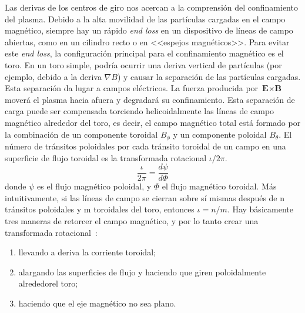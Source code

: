 \par
Las derivas de los centros de giro nos acercan a la comprensión del confinamiento del plasma. 
Debido a la alta movilidad de las partículas cargadas en el campo magnético, siempre hay un 
rápido \textit{end loss} en un dispositivo de líneas de campo abiertas, como en un cilindro recto o en 
<<espejos magnéticos>>. Para evitar este \textit{end loss}, la configuración principal para el 
confinamiento magnético es el toro. En un toro simple, podría ocurrir una deriva vertical de 
partículas (por ejemplo, debido a la deriva $\nabla B$) y causar la separación de las partículas 
cargadas. Esta separación da lugar a campos eléctricos. 
La fuerza producida por $\textbf{E}\times\textbf{B}$ moverá el plasma hacia afuera y degradará su confinamiento. 
Esta separación de carga puede ser compensada torciendo helicoidalmente las líneas 
de campo magnético alrededor del toro, es decir, el campo magnético total está formado por 
la combinación de un componente toroidal $B_\phi$ y un componente poloidal $B_\theta$. El número de 
tránsitos poloidales por cada tránsito toroidal de un campo en una superficie de flujo toroidal 
es la transformada rotacional $\iota/2\pi$.
\begin{equation}\label{eq:transrot}
    \frac{\iota}{2\pi}=\frac{d\psi}{d\Phi}
\end{equation}
donde $\psi$ es el flujo magnético poloidal, y $\Phi$ el flujo magnético toroidal. Más intuitivamente, si
las líneas de campo se cierran sobre sí mismas después de n tránsitos poloidales y m 
toroidales del toro, entonces $\iota=n/m$.\newpage
Hay básicamente tres maneras de retorcer el campo magnético, y por lo tanto crear una transformada rotacional~\cite{Helander_2012}:
\begin{enumerate}[(1)]
    \item llevando a deriva la corriente toroidal;
    \item alargando las superficies de flujo y haciendo que giren poloidalmente alrededorel toro;
    \item haciendo que el eje magnético no sea plano.
\end{enumerate}
